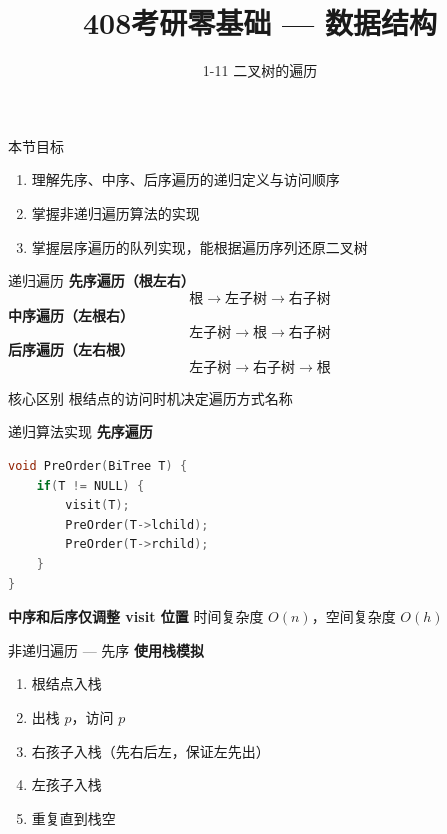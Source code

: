 \documentclass[10pt, aspectratio=169]{beamer}
\title{408考研零基础 --- 数据结构}
\subtitle{1-11 二叉树的遍历}
\author{}
\date{}
\begin{document}
\begin{frame}{本节目标}
    \begin{enumerate}
        \item 理解先序、中序、后序遍历的递归定义与访问顺序
        \item 掌握非递归遍历算法的实现
        \item 掌握层序遍历的队列实现，能根据遍历序列还原二叉树
    \end{enumerate}
\end{frame}

\begin{frame}{递归遍历}
    \textbf{先序遍历（根左右）}
    \[
    \text{根} \to \text{左子树} \to \text{右子树}
    \]
    \textbf{中序遍历（左根右）}
    \[
    \text{左子树} \to \text{根} \to \text{右子树}
    \]
    \textbf{后序遍历（左右根）}
    \[
    \text{左子树} \to \text{右子树} \to \text{根}
    \]
    \vspace{0.5em}
    \begin{block}{核心区别}
        根结点的访问时机决定遍历方式名称
    \end{block}
\end{frame}

\begin{frame}[fragile]{递归算法实现}
    \textbf{先序遍历}
    \begin{lstlisting}[language=C, basicstyle=\ttfamily\small]
void PreOrder(BiTree T) {
    if(T != NULL) {
        visit(T);
        PreOrder(T->lchild);
        PreOrder(T->rchild);
    }
}
    \end{lstlisting}
    \vspace{0.3em}
    \textbf{中序和后序仅调整 visit 位置}
    \vspace{0.3em}
    时间复杂度 $O(n)$，空间复杂度 $O(h)$
\end{frame}

\begin{frame}{非递归遍历 --- 先序}
    \textbf{使用栈模拟}
    \vspace{0.3em}
    \begin{enumerate}
        \item 根结点入栈
        \item 出栈 $p$，访问 $p$
        \item 右孩子入栈（先右后左，保证左先出）
        \item 左孩子入栈
        \item 重复直到栈空
    \end{enumerate}
\end{frame}
\end{document}
